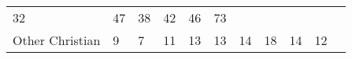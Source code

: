 \documentclass[]{article}
\begin{document}
\begin{longtable}[]{@{}lllllllllll@{}}
\begin{minipage}[t]{0.05\columnwidth}
32\strut
\end{minipage} & \begin{minipage}[t]{0.05\columnwidth}\raggedright\strut
47\strut
\end{minipage} & \begin{minipage}[t]{0.06\columnwidth}\raggedright\strut
38\strut
\end{minipage} & \begin{minipage}[t]{0.06\columnwidth}\raggedright\strut
42\strut
\end{minipage} & \begin{minipage}[t]{0.04\columnwidth}\raggedright\strut
46\strut
\end{minipage} & \begin{minipage}[t]{0.11\columnwidth}\raggedright\strut
73\strut
\end{minipage}\tabularnewline
\begin{minipage}[t]{0.14\columnwidth}\raggedright\strut
Other Christian\strut
\end{minipage} & \begin{minipage}[t]{0.04\columnwidth}\raggedright\strut
9\strut
\end{minipage} & \begin{minipage}[t]{0.05\columnwidth}\raggedright\strut
7\strut
\end{minipage} & \begin{minipage}[t]{0.05\columnwidth}\raggedright\strut
11\strut
\end{minipage} & \begin{minipage}[t]{0.05\columnwidth}\raggedright\strut
13\strut
\end{minipage} & \begin{minipage}[t]{0.05\columnwidth}\raggedright\strut
13\strut
\end{minipage} & \begin{minipage}[t]{0.05\columnwidth}\raggedright\strut
14\strut
\end{minipage} & \begin{minipage}[t]{0.06\columnwidth}\raggedright\strut
18\strut
\end{minipage} & \begin{minipage}[t]{0.06\columnwidth}\raggedright\strut
14\strut
\end{minipage} & \begin{minipage}[t]{0.04\columnwidth}\raggedright\strut
12\strut
\end{minipage} & \begin{minipage}[t]{0.11\columnwidth}\raggedright\strut

\end{minipage}
\end{longtable}
\end{document}
